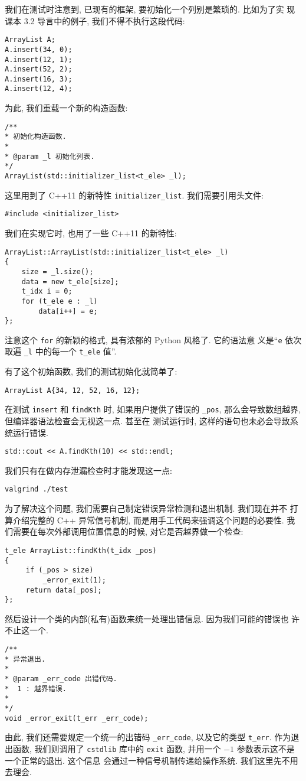 \documentclass[a4paper]{ctexart}
\theoremstyle{definition}
\theoremstyle{definition}
\begin{document}
我们在测试时注意到, 已现有的框架, 要初始化一个列别是繁琐的. 比如为了实
现课本 3.2 导言中的例子, 我们不得不执行这段代码:

\begin{verbatim}
ArrayList A;
A.insert(34, 0);
A.insert(12, 1);
A.insert(52, 2);
A.insert(16, 3);
A.insert(12, 4);
\end{verbatim}

为此, 我们重载一个新的构造函数:

\begin{verbatim}
/** 
* 初始化构造函数.
* 
* @param _l 初始化列表.
*/
ArrayList(std::initializer_list<t_ele> _l);
\end{verbatim}
这里用到了 C++11 的新特性 \verb|initializer_list|. 我们需要引用头文件:
\begin{verbatim}
#include <initializer_list>
\end{verbatim}
我们在实现它时, 也用了一些 C++11 的新特性:
\begin{verbatim}
ArrayList::ArrayList(std::initializer_list<t_ele> _l)
{
	size = _l.size();
	data = new t_ele[size];
	t_idx i = 0;
	for (t_ele e : _l)
		data[i++] = e;
};
\end{verbatim}
注意这个 \verb|for| 的新颖的格式, 具有浓郁的 Python 风格了. 它的语法意
义是``\verb|e| 依次取遍 \verb|_l| 中的每一个 \verb|t_ele| 值''.

有了这个初始函数, 我们的测试初始化就简单了:
\begin{verbatim}
ArrayList A{34, 12, 52, 16, 12};
\end{verbatim}

在测试 \verb|insert| 和 \verb|findKth| 时, 如果用户提供了错误的
\verb|_pos|, 那么会导致数组越界, 但编译器语法检查会无视这一点. 甚至在
测试运行时, 这样的语句也未必会导致系统运行错误.
\begin{verbatim}
std::cout << A.findKth(10) << std::endl;
\end{verbatim}
我们只有在做内存泄漏检查时才能发现这一点:
\begin{verbatim}
valgrind ./test
\end{verbatim}
为了解决这个问题, 我们需要自己制定错误异常检测和退出机制. 我们现在并不
打算介绍完整的 C++ 异常信号机制, 而是用手工代码来强调这个问题的必要性.
我们需要在每次外部调用位置信息的时候, 对它是否越界做一个检查: 
\begin{verbatim}
t_ele ArrayList::findKth(t_idx _pos) 
{
     if (_pos > size)
         _error_exit(1);
     return data[_pos];
};
\end{verbatim}
然后设计一个类的内部(私有)函数来统一处理出错信息. 因为我们可能的错误也
许不止这一个.
\begin{verbatim}
/** 
* 异常退出.
* 
* @param _err_code 出错代码.
*  1 : 越界错误.
* 
*/
void _error_exit(t_err _err_code);
\end{verbatim}
由此, 我们还需要规定一个统一的出错码 \verb|_err_code|, 以及它的类型
\verb|t_err|. 作为退出函数, 我们则调用了 \verb|cstdlib| 库中的
\verb|exit| 函数, 并用一个 $-1$ 参数表示这不是一个正常的退出. 这个信息
会通过一种信号机制传递给操作系统. 我们这里先不用去理会.
\end{document}
